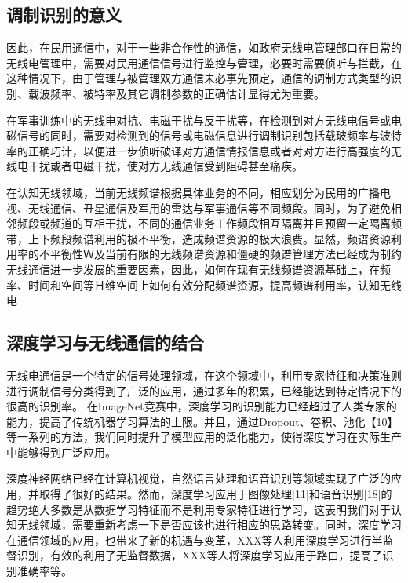 \subsection{调制识别的意义}
因此，在民用通信中，对于一些非合作性的通信，如政府无线电管理部口在日常的无线电管理中，需要对民用通信信号进行监控与管理，必要时需要侦听与拦截，在这种情况下，由于管理与被管理双方通信未必事先预定，通信的调制方式类型的识别、载波频率、被特率及其它调制参数的正确估计显得尤为重要。\par

在军事训练中的无线电对抗、电磁干扰与反干扰等，在检测到对方无线电信号或电磁信号的同时，需要对检测到的信号或电磁信息进行调制识别包括载玻频率与波特率的正确巧计，以便进一步侦听破译对方通信情报信息或者对对方进行高强度的无线电干扰或者电磁干扰，使对方无线通信受到阻碍甚至痛疾。\par

在认知无线领域，当前无线频谱根据具体业务的不同，相应划分为民用的广播电视、无线通信、丑星通信及军用的雷达与军事通信等不同频段。同时，为了避免相邻频段或频道的互相干扰，不同的通信业务工作频段相互隔离并且预留一定隔离频带，上下频段频谱利用的极不平衡，造成频谱资源的极大浪费。显然，频谱资源利用率的不平衡性Ｗ及当前有限的无线频谱资源和僵硬的频谱管理方法已经成为制约无线通信进一步发展的重要因素，因此，如何在现有无线频谱资源基础上，在频率、时间和空间等Ｈ维空间上如何有效分配频谱资源，提高频谱利用率，认知无线电\par

\subsection{深度学习与无线通信的结合}

无线电通信是一个特定的信号处理领域，在这个领域中，利用专家特征和决策准则进行调制信号分类得到了广泛的应用，通过多年的积累，已经能达到特定情况下的很高的识别率。 在ImageNet竞赛中，深度学习的识别能力已经超过了人类专家的能力，提高了传统机器学习算法的上限。并且，通过Dropout、卷积、池化【10】等一系列的方法，我们同时提升了模型应用的泛化能力，使得深度学习在实际生产中能够得到广泛应用。\par

深度神经网络已经在计算机视觉，自然语言处理和语音识别等领域实现了广泛的应用，并取得了很好的结果。然而，深度学习应用于图像处理[11]和语音识别[18]的趋势绝大多数是从数据学习特征而不是利用专家特征进行学习，这表明我们对于认知无线领域，需要重新考虑一下是否应该也进行相应的思路转变。同时，深度学习在通信领域的应用，也带来了新的机遇与变革，XXX等人利用深度学习进行半监督识别，有效的利用了无监督数据，XXX等人将深度学习应用于路由，提高了识别准确率等。\par

